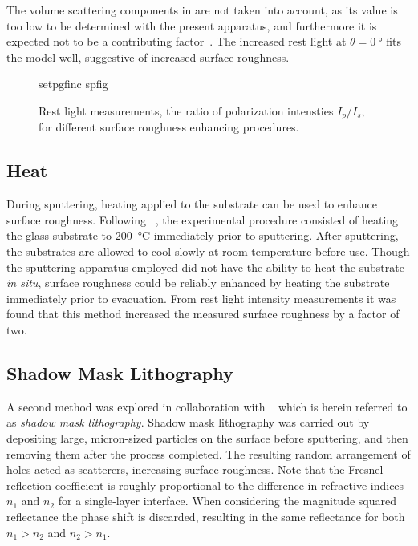 The volume scattering components in  are not taken
into account, as its value is too low to be determined with the present
apparatus, and furthermore it is expected not to be a contributing
factor~\cite{kretschmann1972decay}.  The increased rest light at
$\theta=\SI{0}{\degree}$ fits the model well, suggestive of increased
surface roughness.
\begin{figure}[ht]
 \centering
 {setpgfinc}
 {spfig}
 \caption{Rest light measurements, the ratio of polarization intensties
									$I_p/I_s$,  for different surface roughness enhancing procedures.}
\label{fig:spratio}
\end{figure}

\subsection{Heat}
During sputtering, heating applied to the substrate can be used to enhance
surface roughness.  Following
~\cite{horstmann1977multiple}, the experimental procedure
consisted of heating the glass substrate to \SI{200}{\celsius} immediately
prior to sputtering.  After sputtering, the substrates are allowed to cool
slowly at room temperature before use.  Though the sputtering apparatus
employed did not have the ability to heat the substrate \textit{in situ},
surface roughness could be reliably enhanced by heating the substrate
immediately prior to evacuation.  From rest light intensity measurements it
was found that this method increased the measured surface roughness by a
factor of two.

\subsection{Shadow Mask Lithography}
A second method was explored in collaboration with
~\cite{huang2014speckle} which is herein referred to as
\textit{shadow mask lithography}.  Shadow mask lithography was carried out
by depositing large, micron-sized particles on the surface before
sputtering, and then removing them after the process completed.  The
resulting random arrangement of holes acted as scatterers, increasing
surface roughness.  Note that the Fresnel reflection coefficient is roughly
proportional to the difference in refractive indices $n_1$ and $n_2$ for a
single-layer interface.  When considering the magnitude squared reflectance
the phase shift is discarded, resulting in the same reflectance for both
$n_1>n_2$ and $n_2>n_1$.

